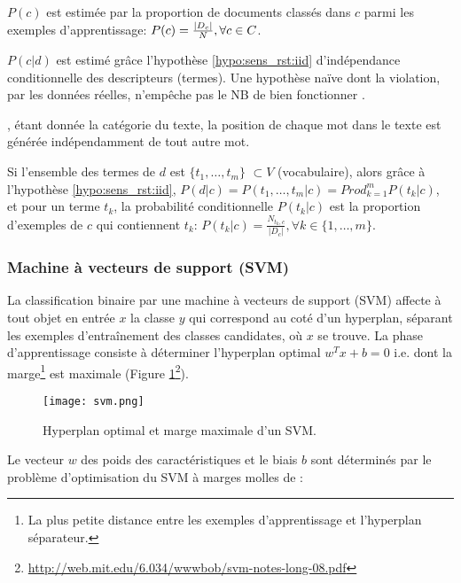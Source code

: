$P(c)$ est estimée par la proportion de documents classés dans $c$ parmi les exemples d'apprentissage: $P(c) = \frac{{\vert D_c\vert}}{N}, \forall c \in C$.


 $P(c \vert d)$ est estimé grâce l'hypothèse \ref{hypo:sens_rst:iid} d'{indépendance conditionnelle des descripteurs (termes)}. Une hypothèse naïve dont la violation, par les données réelles, n'empêche pas le NB de bien fonctionner \citep{rish2001nb_study}. 

\begin{hypothese}, étant donnée la catégorie du texte, la position de chaque mot dans le texte est générée indépendamment de tout autre mot. \label{hypo:sens_rst:iid}
\end{hypothese}

Si l'ensemble des termes de $d$ est $\lbrace t_{1}, \dots, t_m \rbrace$ $\subset V$ (vocabulaire), alors grâce à l'hypothèse \ref{hypo:sens_rst:iid},
$P(d \vert c) = P(t_{1}, \dots, t_m\vert c) = Prod_{k=1}^m P(t_{k} \vert c)$, et pour un terme $t_k$, la probabilité conditionnelle $P(t_k \vert c)$ est la proportion d'exemples de $c$ qui contiennent $t_k$: $P(t_k \vert c) = \frac{N_{t_k,c}}{\vert D_c \vert }, \forall k \in \lbrace 1, \dots, m \rbrace$.

\subsubsection{Machine à vecteurs de support (SVM)}
\label{sec:sens-resultat:svm}
La classification binaire par une machine à vecteurs de support (SVM) \citep{vapnik1995statlearning} affecte à tout objet en entrée $x$ la classe $y$ qui correspond au coté d'un hyperplan, séparant les exemples d'entraînement des classes candidates, où $x$ se trouve. La phase d'apprentissage consiste à déterminer l'hyperplan optimal $w^T x + b = 0$ i.e. dont la marge\footnote{La plus petite distance entre les exemples d'apprentissage et l'hyperplan séparateur.} est maximale (Figure \ref{fig:sensresultat:svm}\footnote{\url{http://web.mit.edu/6.034/wwwbob/svm-notes-long-08.pdf}}).

\begin{figure}[!htb]
	\centering
	\texttt{[image: svm.png]}
	\caption{Hyperplan optimal et marge maximale d'un SVM.}\label{fig:sensresultat:svm}
\end{figure}

 Le vecteur $w$ des poids des caractéristiques et le biais $b$ sont déterminés par le problème d'optimisation du \og SVM à marges molles \fg{} de \citet{Cortes1995svm} :
 

